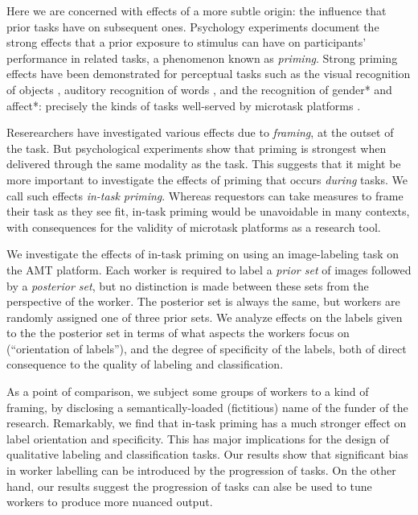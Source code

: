\documentclass[a4paper]{report}
\begin{document}
Here we are concerned with effects of a more subtle origin: the influence that
prior tasks have on subsequent ones.  Psychology experiments document the 
strong effects that a prior exposure to stimulus can have on participants' 
performance in related tasks, a phenomenon known as \textit{priming}.  Strong 
priming effects have been demonstrated for
perceptual tasks such as the visual recognition of 
objects \cite{BJOP:BJOP1796},
auditory recognition of words \cite{BJOP:BJOP1826}, and the recognition
of gender* and affect*: precisely the kinds of tasks well-served by microtask 
platforms \cite{yuen2011survey, snow2008cheap}.  

Reserearchers 
have investigated various effects due to \textit{framing}, at the outset of 
the task.  But psychological experiments show that priming is strongest when 
delivered through the same modality as the task.  This suggests that it might
be more important to investigate the effects of priming that occurs 
\textit{during} tasks.  We call such effects \textit{in-task priming}.  
Whereas requestors can take measures to frame 
their task as they see fit, in-task priming would be unavoidable in many 
contexts, with consequences for the validity of microtask platforms as a 
research tool.

We investigate the effects of in-task priming on using an image-labeling task
on the AMT platform.  Each worker is required to label a \textit{prior set} of
images followed by a \textit{posterior set}, but no distinction is made between
these sets from the perspective of the worker.  The posterior set is
always the same, but workers are randomly assigned one of three prior sets.
We analyze effects on the labels given to the the posterior set in terms of 
what aspects the workers focus on (``orientation of labels''), and the degree 
of specificity of the labels, both of direct consequence to the quality of 
labeling and classification.

As a point of comparison, we subject some groups of workers to a kind of
framing, by disclosing a semantically-loaded (fictitious) name of the 
funder of the research.  Remarkably, we find that in-task priming has a much 
stronger effect
on label orientation and specificity.  This has major implications for the 
design of qualitative labeling and classification tasks.  Our results show that
significant bias in worker labelling can be introduced by the progression of 
tasks.  On the other hand, our results suggest the progression of tasks can 
alse be used to tune workers to produce more nuanced output.
\end{document}
